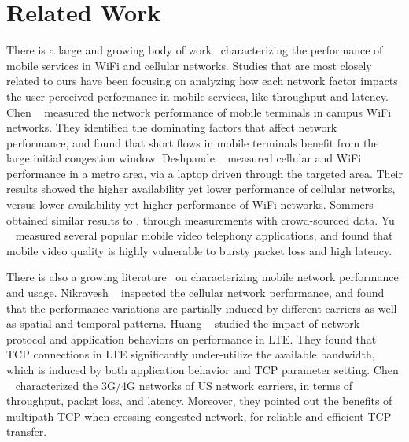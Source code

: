 
\section{Related Work}
\label{sec:related}

There is a large and growing body of work~\cite{chen2012network,deshpande2010performance,sommers2012cell,sharma2010goodput,yu2014can} characterizing the performance of mobile services in WiFi and cellular networks. Studies that are most closely related to ours have been focusing on analyzing how each network factor impacts the user-perceived performance in mobile services, like throughput and latency. Chen \etal~\cite{chen2012network} measured the network performance of mobile terminals in campus WiFi networks. They identified the dominating factors that affect network performance, and found that short flows in mobile terminals benefit from the large initial congestion window. Deshpande \etal~\cite{deshpande2010performance} measured cellular and WiFi performance in a metro area, via a laptop driven through the targeted area. Their results showed the higher availability yet lower performance of cellular networks, versus lower availability yet higher performance of WiFi networks. Sommers \etal~\cite{sommers2012cell} obtained similar results to \cite{deshpande2010performance}, through measurements with crowd-sourced data. Yu \etal~\cite{yu2014can} measured several popular mobile video telephony applications, and found that mobile video quality is highly vulnerable to bursty packet loss and high latency. 

There is also a growing literature~\cite{nikravesh2014mobile,deng2014wifi,huang2013depth,UM-CS-2012-022} on characterizing mobile network performance and usage. Nikravesh \etal~\cite{nikravesh2014mobile} inspected the cellular network performance, and found that the performance variations are partially induced by different carriers as well as spatial and temporal patterns. Huang \etal~\cite{huang2013depth} studied the impact of network protocol and application behaviors on performance in LTE. They found that TCP connections in LTE significantly under-utilize the available bandwidth, which is induced by both application behavior and TCP parameter setting. Chen \etal~\cite{UM-CS-2012-022} characterized the 3G/4G networks of US network carriers, in terms of throughput, packet loss, and latency. Moreover, they pointed out the benefits of multipath TCP when crossing congested network, for reliable and efficient TCP transfer.

